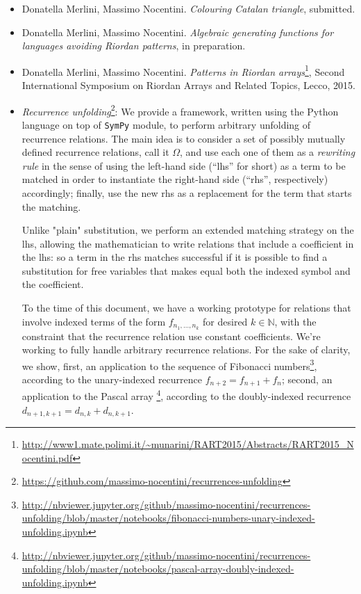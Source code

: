 \documentclass[a4paper]{tufte-handout}
\begin{document}
    \begin{itemize}

        \item Donatella Merlini, Massimo Nocentini. \emph{Colouring Catalan triangle}, submitted.

        \item Donatella Merlini, Massimo Nocentini. \emph{Algebraic generating functions for languages
            avoiding Riordan patterns}, in preparation.

        \item Donatella Merlini, Massimo Nocentini. \emph{Patterns in Riordan arrays}\footnote{\url{http://www1.mate.polimi.it/~munarini/RART2015/Abstracts/RART2015_Nocentini.pdf}}, 
            Second International Symposium on Riordan Arrays and Related Topics, Lecco, 2015.

        \item \emph{Recurrence unfolding}\footnote{\url{https://github.com/massimo-nocentini/recurrences-unfolding}}: 
            We provide a framework, written using the Python language
            on top of \texttt{SymPy} module, to perform arbitrary unfolding of recurrence relations. The main idea
            is to consider a set of possibly mutually defined recurrence relations, call it $\Omega$, and use each
            one of them as a \emph{rewriting rule} in the sense of using the left-hand side (``lhs'' for short) 
            as a term to be matched in order to instantiate the right-hand side (``rhs'', respectively) accordingly; 
            finally, use the new rhs as a replacement for the term that starts the matching. 

            Unlike "plain" substitution, we perform an extended matching strategy on the lhs, 
            allowing the mathematician to write relations that include a coefficient in the lhs: so a term in the rhs
            matches successful if it is possible to find a substitution for free variables that makes equal both
            the indexed symbol and the coefficient.

            To the time of this document, we have a working prototype for relations that involve indexed terms of the
            form $f_{n_{1}, \ldots, n_{k}}$ for desired $k\in\mathbb{N}$, with the constraint that the recurrence relation 
            use constant coefficients. We're working to fully handle arbitrary recurrence relations. For the sake of 
            clarity, we show, first, an application to the sequence of Fibonacci numbers\footnote{\url{http://nbviewer.jupyter.org/github/massimo-nocentini/recurrences-unfolding/blob/master/notebooks/fibonacci-numbers-unary-indexed-unfolding.ipynb}},
            according to the unary-indexed recurrence $f_{n+2}=f_{n+1}+f_{n}$; second, an application to the Pascal array
            \footnote{\url{http://nbviewer.jupyter.org/github/massimo-nocentini/recurrences-unfolding/blob/master/notebooks/pascal-array-doubly-indexed-unfolding.ipynb}},
            according to the doubly-indexed recurrence $d_{n+1,k+1} = d_{n,k}+d_{n,k+1}$.


\end{itemize}
\end{document}
